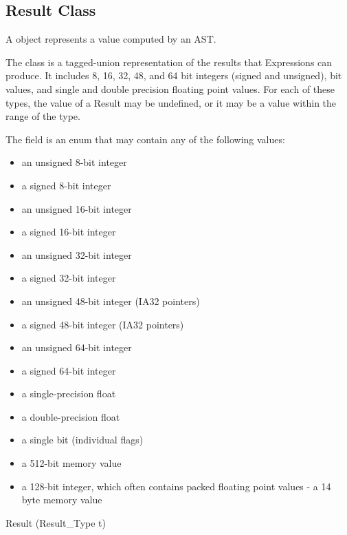 \subsection{Result Class}
\label{sec:result}

A  object represents a value computed by an  AST.

The  class is a tagged-\/union representation of the results that Expressions can produce. It includes 8, 16, 32, 48, and 64 bit integers (signed and unsigned), bit values, and single and double precision floating point values. For each of these types, the value of a Result may be undefined, or it may be a value within the range of the type.

The  field is an enum that may contain any of the following values:

\begin{itemize}
\item {} an unsigned 8-\/bit integer
\item {} a signed 8-\/bit integer
\item {} an unsigned 16-\/bit integer
\item {} a signed 16-\/bit integer
\item {} an unsigned 32-\/bit integer
\item {} a signed 32-\/bit integer
\item {} an unsigned 48-\/bit integer (IA32 pointers)
\item {} a signed 48-\/bit integer (IA32 pointers)
\item {} an unsigned 64-\/bit integer
\item {} a signed 64-\/bit integer
\item {} a single-\/precision float
\item {} a double-\/precision float
\item {} a single bit (individual flags)
\item {} a 512-\/bit memory value
\item {} a 128-\/bit integer, which often contains packed floating point values -\/  a 14 byte memory value 
\end{itemize}

\begin{apient}
Result (Result_Type t)
\end{apient}


